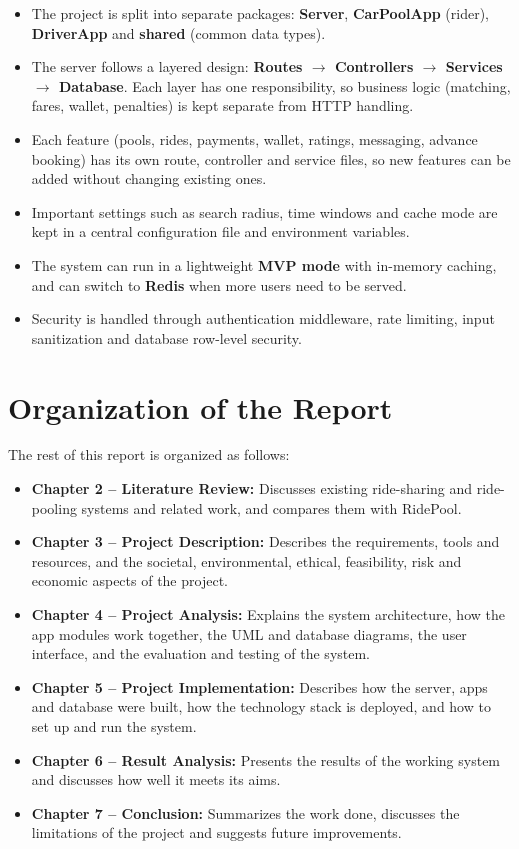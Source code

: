 \begin{itemize}
  \item The project is split into separate packages: \textbf{Server},
        \textbf{CarPoolApp} (rider), \textbf{DriverApp} and \textbf{shared}
        (common data types).
  \item The server follows a layered design: \textbf{Routes $\rightarrow$
        Controllers $\rightarrow$ Services $\rightarrow$ Database}. Each layer
        has one responsibility, so business logic (matching, fares, wallet,
        penalties) is kept separate from HTTP handling.
  \item Each feature (pools, rides, payments, wallet, ratings, messaging,
        advance booking) has its own route, controller and service files, so
        new features can be added without changing existing ones.
  \item Important settings such as search radius, time windows and cache mode
        are kept in a central configuration file and environment variables.
  \item The system can run in a lightweight \textbf{MVP mode} with in-memory
        caching, and can switch to \textbf{Redis} when more users need to be
        served.
  \item Security is handled through authentication middleware, rate limiting,
        input sanitization and database row-level security.
\end{itemize}

\section{Organization of the Report}
\label{sec:organization}

The rest of this report is organized as follows:

\begin{itemize}
  \item \textbf{Chapter 2 -- Literature Review:} Discusses existing
        ride-sharing and ride-pooling systems and related work, and compares
        them with RidePool.
  \item \textbf{Chapter 3 -- Project Description:} Describes the requirements,
        tools and resources, and the societal, environmental, ethical,
        feasibility, risk and economic aspects of the project.
  \item \textbf{Chapter 4 -- Project Analysis:} Explains the system
        architecture, how the app modules work together, the UML and database
        diagrams, the user interface, and the evaluation and testing of the
        system.
  \item \textbf{Chapter 5 -- Project Implementation:} Describes how the
        server, apps and database were built, how the technology stack is
        deployed, and how to set up and run the system.
  \item \textbf{Chapter 6 -- Result Analysis:} Presents the results of the
        working system and discusses how well it meets its aims.
  \item \textbf{Chapter 7 -- Conclusion:} Summarizes the work done, discusses
        the limitations of the project and suggests future improvements.
\end{itemize}

